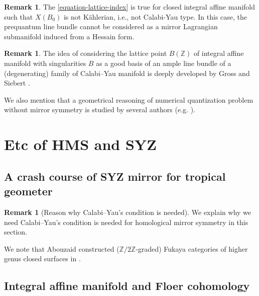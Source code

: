 \documentclass[a4paper,dvipdfmx,reqno,12pt]{amsart}
\theoremstyle{definition}
\newtheorem{remark}[theorem]{Remark}
\numberwithin{equation}{section}
\begin{document}
\begin{remark}
The \cref{equation-lattice-index} is 
true for closed integral affine manifold 
such that $X(B_0)$ is not K\"ahlerian, i.e., 
not Calabi-Yau type.
In this case,
the prequantum line bundle cannot be considered as
a mirror Lagrangian submanifold induced from a Hessain
form.
\end{remark}



\begin{remark}

The idea of considering the lattice point 
$B(\mathbb{Z})$ of 
integral affine manifold with singularities $B$ as 
a good basis of an ample line bundle of 
a (degenerating) family of Calabi--Yau manifold is 
deeply developed by Gross and Siebert 
\cite[Conjecture 1.6]{MR3525095}. 




We also mention that a geometrical reasoning 
of numerical quantization problem without
mirror symmetry is studied by several authors 
(e.g. \cite{MR2879247,
https://doi.org/10.48550/arxiv.1904.04076}).
\end{remark}



\section{Etc of HMS and SYZ}

\subsection{A crash course of SYZ mirror for tropical 
geometer}

\begin{remark}[{Reason why Calabi--Yau's condition is needed}]

We explain why we need Calabi--Yau's condition is needed for
homological mirror symmetry in this section.

We note that Abouzaid constructed ($\mathbb{Z}/2\mathbb{Z}$-graded)
Fukaya categories of higher genus closed surfaces in
\cite{MR2383898}. 
\end{remark}





\subsection{Integral affine manifold and Floer cohomology}
\end{document}
